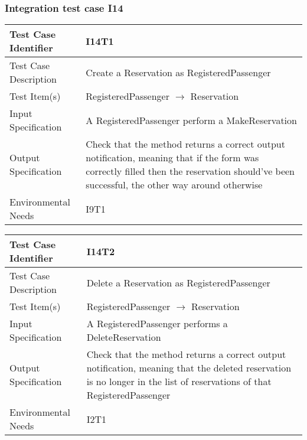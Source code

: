 		\subsubsection{Integration test case I14}
		\begin{center}
			\begin{tabular}{ |l p{10cm}| } \hline
				Test Case Identifier & I14T1 \\ \hline
				Test Case Description & Create a Reservation as RegisteredPassenger \\ \hline
				Test Item(s) & RegisteredPassenger $\rightarrow$ Reservation \\ \hline
				Input Specification & A RegisteredPassenger perform a MakeReservation \\ \hline
				Output Specification & Check that the method returns a correct output notification, meaning that if the form was correctly filled then
				the reservation should've been successful, the other way around otherwise\\ \hline
				Environmental Needs & I9T1 \\ \hline
			\end{tabular}
		\end{center}
		\begin{center}
			\begin{tabular}{ |l p{10cm}| } \hline
				Test Case Identifier & I14T2 \\ \hline
				Test Case Description & Delete a Reservation as RegisteredPassenger \\ \hline
				Test Item(s) & RegisteredPassenger $\rightarrow$ Reservation \\ \hline
				Input Specification & A RegisteredPassenger performs a DeleteReservation\\ \hline
				Output Specification & Check that the method returns a correct output notification, meaning that the deleted reservation is no longer in the
				list of reservations of that RegisteredPassenger \\ \hline
				Environmental Needs & I2T1 \\ \hline
			\end{tabular}
		\end{center}
